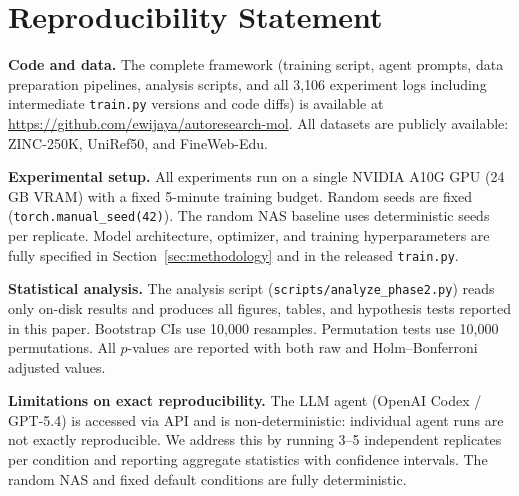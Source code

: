 \section*{Reproducibility Statement}
\label{sec:reproducibility}

\textbf{Code and data.} The complete framework (training script, agent prompts, data preparation pipelines, analysis scripts, and all 3{,}106 experiment logs including intermediate \texttt{train.py} versions and code diffs) is available at \url{https://github.com/ewijaya/autoresearch-mol}. All datasets are publicly available: ZINC-250K, UniRef50, and FineWeb-Edu.

\textbf{Experimental setup.} All experiments run on a single NVIDIA A10G GPU (24\,GB VRAM) with a fixed 5-minute training budget. Random seeds are fixed (\texttt{torch.manual\_seed(42)}). The random NAS baseline uses deterministic seeds per replicate. Model architecture, optimizer, and training hyperparameters are fully specified in Section~\ref{sec:methodology} and in the released \texttt{train.py}.

\textbf{Statistical analysis.} The analysis script (\texttt{scripts/analyze\_phase2.py}) reads only on-disk results and produces all figures, tables, and hypothesis tests reported in this paper. Bootstrap CIs use 10{,}000 resamples. Permutation tests use 10{,}000 permutations. All $p$-values are reported with both raw and Holm--Bonferroni adjusted values.

\textbf{Limitations on exact reproducibility.} The LLM agent (OpenAI Codex / GPT-5.4) is accessed via API and is non-deterministic: individual agent runs are not exactly reproducible. We address this by running 3--5 independent replicates per condition and reporting aggregate statistics with confidence intervals. The random NAS and fixed default conditions are fully deterministic.
